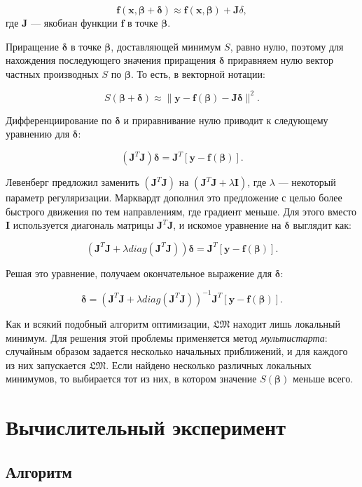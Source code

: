 \documentclass[12pt,a4paper]{amsart}
\begin{document}
\[
\mathbf{f(x, \beta + \delta)} \approx
	\mathbf{f(x, \beta)} + \mathbf{J} \delta,
\]
где $\mathbf{J}$ --- якобиан функции $\mathbf{f}$ в точке $\mathbf{\beta}$.

Приращение $\mathbf{\delta}$ в точке $\mathbf{\beta}$, доставляющей минимум $S$,
равно нулю, поэтому для нахождения последующего значения приращения $\mathbf{\delta}$
приравняем нулю вектор частных производных $S$ по $\mathbf{\beta}$. То есть,
в векторной нотации:

\[
S(\mathbf{\beta + \delta}) \approx \| \mathbf{y - f (\beta) - J\delta} \|^2.
\]

Дифференциирование по $\mathbf{\delta}$ и приравнивание нулю приводит к
следующему уравнению для $\mathbf{\delta}$:

\[
(\mathbf{J}^T\mathbf{J})\mathbf{\delta} = \mathbf{J}^T [\mathbf{y - f(\beta)}].
\]

Левенберг предложил заменить $(\mathbf{J}^T\mathbf{J})$ на
$(\mathbf{J}^T\mathbf{J} + \lambda\mathbf{I})$, где $\lambda$ --- некоторый
параметр регуляризации. Марквардт дополнил это предложение с целью более быстрого
движения по тем направлениям, где градиент меньше. Для этого вместо $\mathbf{I}$
используется диагональ матрицы $\mathbf{J}^T\mathbf{J}$, и искомое уравнение на
$\mathbf{\delta}$ выглядит как:

\[
(\mathbf{J}^T\mathbf{J} + \lambda diag (\mathbf{J}^T\mathbf{J}))\mathbf{\delta} = \mathbf{J}^T [\mathbf{y - f(\beta)}].
\]

Решая это уравнение, получаем окончательное выражение для $\mathbf{\delta}$:

\[
\mathbf{\delta} = (\mathbf{J}^T\mathbf{J} + \lambda diag (\mathbf{J}^T\mathbf{J}))^{-1} \mathbf{J}^T [\mathbf{y - f(\beta)}].
\]

Как и всякий подобный алгоритм оптимизации, $\mathfrak{LM}$ находит лишь
локальный минимум. Для решения этой проблемы применяется метод \emph{мультистарта}:
случайным образом задается несколько начальных приближений, и для каждого из
них запускается $\mathfrak{LM}$. Если найдено несколько различных локальных
минимумов, то выбирается тот из них, в котором значение $S(\mathbf{\beta})$
меньше всего.

\section{Вычислительный эксперимент}

\subsection{Алгоритм}
\end{document}
